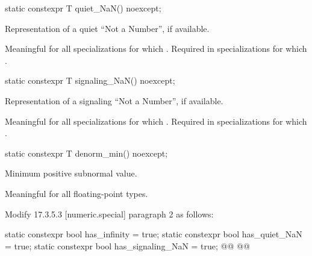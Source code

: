 \begin{wgText}
\begin{itemdecl}
static constexpr T quiet_NaN() noexcept;
\end{itemdecl}

\begin{itemdescr}
  \pnum
  Representation of a quiet “Not a Number”, if available.

  \pnum
  Meaningful for all specializations for which . Required in specializations for
  which .
\end{itemdescr}

\begin{itemdecl}
static constexpr T signaling_NaN() noexcept;
\end{itemdecl}

\begin{itemdescr}
  \pnum
  Representation of a signaling “Not a Number”, if available.

  \pnum
  Meaningful for all specializations for which . Required in specializations
  for which .
\end{itemdescr}

\begin{itemdecl}
static constexpr T denorm_min() noexcept;
\end{itemdecl}

\begin{itemdescr}
  \pnum
  Minimum positive subnormal value.

  \pnum
  Meaningful for all floating-point types.

  \begin{wgBRem}
  \pnum
  \end{wgBRem}
\end{itemdescr}
\end{wgText}

Modify 17.3.5.3 [numeric.special] paragraph 2 as follows:
\begin{wgText}
\begin{codeblock}
    static constexpr bool has_infinity = true;
    static constexpr bool has_quiet_NaN = true;
    static constexpr bool has_signaling_NaN = true;
    @@
    @@

\end{codeblock}
\end{wgText}

